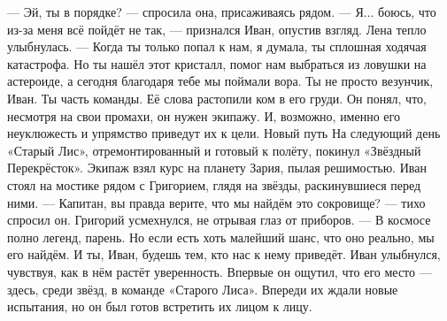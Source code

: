 \documentclass[12pt,a4paper]{book}
\begin{document}
— Эй, ты в порядке? — спросила она, присаживаясь рядом.
— Я... боюсь, что из-за меня всё пойдёт не так, — признался Иван, опустив взгляд.
Лена тепло улыбнулась.
— Когда ты только попал к нам, я думала, ты сплошная ходячая катастрофа. Но ты нашёл этот кристалл, помог нам выбраться из ловушки на астероиде, а сегодня благодаря тебе мы поймали вора. Ты не просто везунчик, Иван. Ты часть команды.
Её слова растопили ком в его груди. Он понял, что, несмотря на свои промахи, он нужен экипажу. И, возможно, именно его неуклюжесть и упрямство приведут их к цели.
Новый путь
На следующий день «Старый Лис», отремонтированный и готовый к полёту, покинул «Звёздный Перекрёсток». Экипаж взял курс на планету Зария, пылая решимостью. Иван стоял на мостике рядом с Григорием, глядя на звёзды, раскинувшиеся перед ними.
— Капитан, вы правда верите, что мы найдём это сокровище? — тихо спросил он.
Григорий усмехнулся, не отрывая глаз от приборов.
— В космосе полно легенд, парень. Но если есть хоть малейший шанс, что оно реально, мы его найдём. И ты, Иван, будешь тем, кто нас к нему приведёт.
Иван улыбнулся, чувствуя, как в нём растёт уверенность. Впервые он ощутил, что его место — здесь, среди звёзд, в команде «Старого Лиса». Впереди их ждали новые испытания, но он был готов встретить их лицом к лицу.
\end{document}

